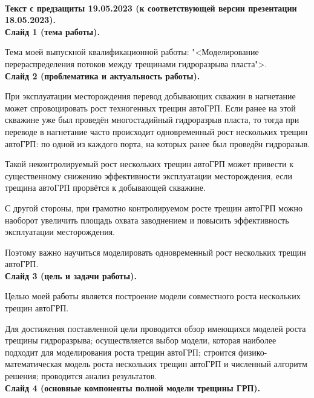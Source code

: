 \documentclass[a4paper, 12pt]{article}
\begin{document}
\newpage
\ 
\newpage

















\textbf{\large Текст с предзащиты 19.05.2023 (к соответствующей версии презентации 18.05.2023).}\\

\textbf{Слайд 1 (тема работы).}

Тема моей выпускной квалификационной работы: "<Моделирование перераспределения потоков между трещинами гидроразрыва пласта">.\\

\textbf{Слайд 2 (проблематика и актуальность работы).}

При эксплуатации месторождения перевод добывающих скважин в нагнетание может спровоцировать рост техногенных трещин автоГРП.
Если ранее на этой скважине уже был проведён многостадийный гидроразрыв пласта, то тогда при переводе в нагнетание часто происходит одновременный рост нескольких трещин автоГРП: по одной из каждого порта, на которых ранее был проведён гидроразыв.

Такой неконтролируемый рост нескольких трещин автоГРП может привести к существенному снижению эффективности эксплуатации месторождения, если трещина автоГРП прорвётся к добывающей скважине.

С другой стороны, при грамотно контролируемом росте трещин автоГРП можно наоборот увеличить площадь охвата заводнением и повысить эффективность эксплуатации месторождения.

Поэтому важно научиться моделировать одновременный рост нескольких трещин автоГРП.\\ 

\textbf{Слайд 3 (цель и задачи работы).}

Целью моей работы является построение модели совместного роста нескольких трещин автоГРП.

Для достижения поставленной цели проводится обзор имеющихся моделей роста трещины гидроразрыва;
осуществляется выбор модели, которая наиболее подходит для моделирования роста трещин автоГРП;
строится физико-математическая модель роста нескольких трещин автоГРП и численный алгоритм решения;
проводится анализ результатов.\\

\textbf{Слайд 4 (основные компоненты полной модели трещины ГРП).}
\end{document}
